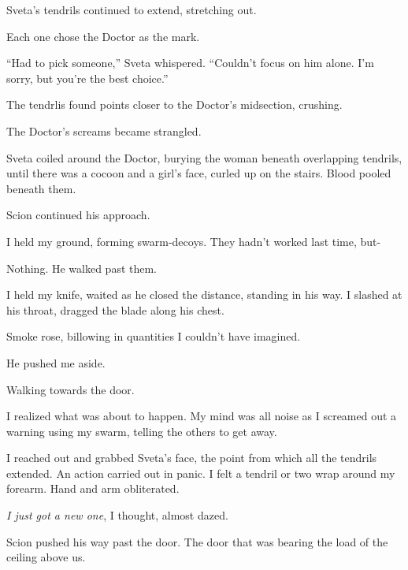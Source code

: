 Sveta's tendrils continued to extend, stretching out.



Each one chose the Doctor as the mark.



``Had to pick someone,'' Sveta whispered.  ``Couldn't focus on him alone.  I'm sorry, but you're the best choice.''



The tendrlis found points closer to the Doctor's midsection, crushing.



The Doctor's screams became strangled.



Sveta coiled around the Doctor, burying the woman beneath overlapping tendrils, until there was a cocoon and a girl's face, curled up on the stairs.  Blood pooled beneath them.



Scion continued his approach.



I held my ground, forming swarm-decoys.  They hadn't worked last time,  but-



Nothing.  He walked past them.



I held my knife, waited as he closed the distance, standing in his way.  I slashed at his throat, dragged the blade along his chest.



Smoke rose, billowing in quantities I couldn't have imagined.



He pushed me aside.



Walking towards the door.



I realized what was about to happen.  My mind was all noise as I screamed out a warning using my swarm, telling the others to get away.



I reached out and grabbed Sveta's face, the point from which all the tendrils extended.  An action carried out in panic.  I felt a tendril or two wrap around my forearm.  Hand and arm obliterated.



\emph{I just got a new one}, I thought, almost dazed.



Scion pushed his way past the door.  The door that was bearing the load of the ceiling above us.



